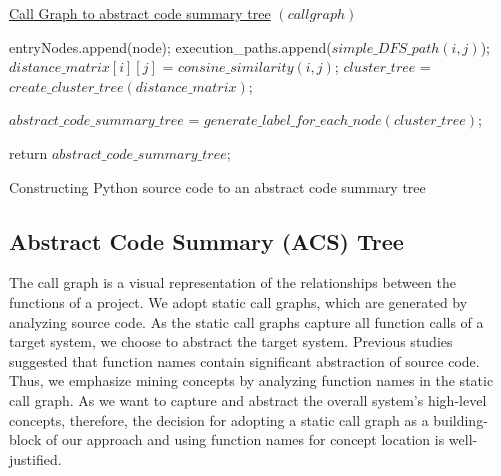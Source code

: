 \label{approach}

\begin{algorithm}
    
    \underline{Call Graph to abstract code summary tree} $(call graph)$\;
    
    {
        {
            entryNodes.append(node);
        }
    } 
    {
        {
            execution\_paths.append($simple\_DFS\_path(i, j)$);
        }
    }
    {
        {
            $distance\_matrix[i][j]$ = $consine\_similarity(i,j)$;
        }
    }
    $cluster\_tree$ = $create\_cluster\_tree(distance\_matrix)$;
    
    $abstract\_code\_summary\_tree$ = $generate\_label\_for\_each\_node(cluster\_tree)$;
    
    return $abstract\_code\_summary\_tree$;
    \caption{Constructing Python source code to an abstract code summary tree}
    \label{hla1:alg:overall}
\end{algorithm}

\subsection{Abstract Code Summary (ACS) Tree}
\label{hla1:approach_acs}
The call graph is a visual representation of the relationships between the functions of a project. We adopt static call graphs, which are generated by analyzing source code. As the static call
graphs capture all function calls of a target system, we
choose to abstract the target system. Previous studies suggested that function names contain significant abstraction of source code. Thus, we emphasize mining concepts by analyzing function names in the static call graph.
As we want to capture and abstract the overall system's high-level concepts, therefore, the decision for adopting a static call graph as a building-block of our approach and using function names for concept location is well-justified.  

